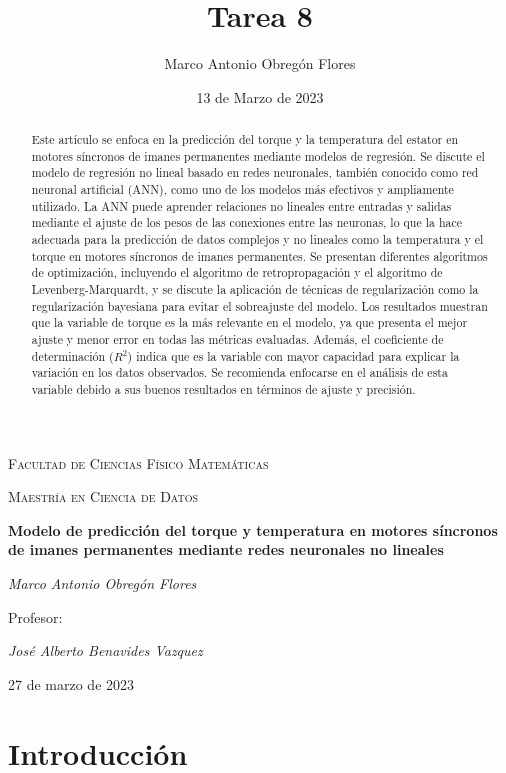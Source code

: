 \documentclass{article}
\title{Tarea 8}
\author{Marco Antonio Obregón Flores}
\date{13 de Marzo de 2023}
\begin{document}
\begin{titlepage}
    \centering
    {\scshape\large Facultad de Ciencias Físico Matemáticas\par}
    {\scshape\large Maestría en Ciencia de Datos\par}
    \vspace{1cm}
    {\huge\bfseries Modelo de predicción del torque y temperatura en motores síncronos de imanes permanentes mediante redes neuronales no lineales\par}
    \vspace{2cm}
    {\Large\itshape Marco Antonio Obregón Flores\par}
    \vfill
    {\large Profesor:\par}
    {\Large\itshape José Alberto Benavides Vazquez\par}
    \vspace{1cm}
    {\large 27 de marzo de 2023\par}
\end{titlepage}

\begin{abstract}
Este artículo se enfoca en la predicción del torque y la temperatura del estator en motores síncronos de imanes permanentes mediante modelos de regresión. Se discute el modelo de regresión no lineal basado en redes neuronales, también conocido como red neuronal artificial (ANN), como uno de los modelos más efectivos y ampliamente utilizado. La ANN puede aprender relaciones no lineales entre entradas y salidas mediante el ajuste de los pesos de las conexiones entre las neuronas, lo que la hace adecuada para la predicción de datos complejos y no lineales como la temperatura y el torque en motores síncronos de imanes permanentes. Se presentan diferentes algoritmos de optimización, incluyendo el algoritmo de retropropagación y el algoritmo de Levenberg-Marquardt, y se discute la aplicación de técnicas de regularización como la regularización bayesiana para evitar el sobreajuste del modelo.
Los resultados muestran que la variable de torque es la más relevante en el modelo, ya que presenta el mejor ajuste y menor error en todas las métricas evaluadas. Además, el coeficiente de determinación ($R^2$) indica que es la variable con mayor capacidad para explicar la variación en los datos observados. Se recomienda enfocarse en el análisis de esta variable debido a sus buenos resultados en términos de ajuste y precisión.
\end{abstract}

\section{Introducción}
\setlength{\parskip}{10pt}
\end{document}
